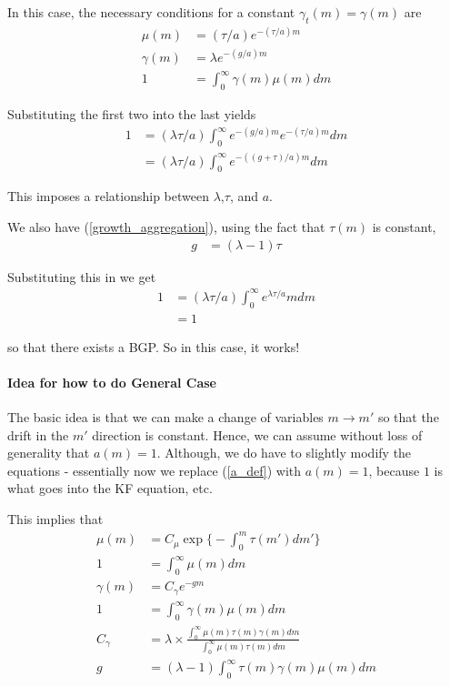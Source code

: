 \documentclass[12pt,english]{article}
\theoremstyle{remark}
\begin{document}
In this case, the necessary conditions for a constant $\gamma_t(m) = \gamma(m)$ are 
\begin{align*}
	\mu(m) &= (\tau / a) e^{-(\tau/a)m} \\
	\gamma(m) &= \lambda e^{-(g/a)m} \\
	1 &= \int_0^{\infty} \gamma(m) \mu(m) dm
\end{align*}

Substituting the first two into the last yields
\begin{align*}
	1 &= (\lambda \tau / a)  \int_0^{\infty} e^{-(g/a)m} e^{-(\tau/a)m} dm \\ 
	  &= (\lambda \tau / a)  \int_0^{\infty} e^{-((g + \tau)/a)m} dm
\end{align*}

This imposes a relationship between $\lambda$,$\tau$, and $a$.

We also have (\ref{growth_aggregation}), using the fact that $\tau(m)$ is constant, 
\begin{align*}
	g &= (\lambda-1) \tau 
\end{align*}

Substituting this in we get 
\begin{align*}
	1 &= (\lambda \tau / a) \int_0^{\infty} e^{\lambda \tau / a} m dm \\
	  &= 1
\end{align*}

so that there exists a BGP. So in this case, it works!

\paragraph{Idea for how to do General Case}
The basic idea is that we can make a change of variables $m \to m'$ so that the drift in the $m'$ direction is constant. Hence, we can assume without loss of generality that $a(m) = 1$. Although, we do have to slightly modify the equations - essentially now we replace (\ref{a_def}) with $a(m) = 1$, because $1$ is what goes into the KF equation, etc. 

This implies that
\begin{align*}
	\mu(m) &= C_{\mu} \exp \Big\{  -\int_{0}^{m} \tau(m') dm'\Big\} \\
	1 &= \int_{0}^{\infty} \mu(m) dm \\
	\gamma(m) &= C_{\gamma} e^{-gm} \\
	1 &= \int_{0}^{\infty}\gamma(m) \mu(m) dm \\ 
	C_{\gamma} &= \lambda \times \frac{\int_{0}^{\infty} \mu(m) \tau(m) \gamma(m) dm}{\int_{0}^{\infty} \mu(m) \tau(m)dm} \\
	g &= (\lambda -1) \int_{0}^{\infty} \tau(m) \gamma(m) \mu(m) dm
\end{align*}
\end{document}
